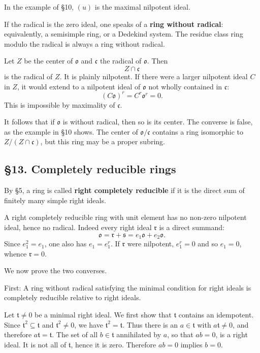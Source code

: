 \documentclass[11pt]{article}
\begin{document}
In the example of §10, \((u)\) is the maximal nilpotent ideal.

If the radical is the zero ideal, one speaks of a \textbf{ring without
radical}: equivalently, a semisimple ring, or a Dedekind system. The
residue class ring modulo the radical is always a ring without radical.

Let \(Z\) be the center of \(\mathfrak{o}\) and \(\mathfrak c\) the
radical of \(\mathfrak{o}\). Then \[
  Z\cap\mathfrak c
\] is the radical of \(Z\). It is plainly nilpotent. If there were a
larger nilpotent ideal \(C\) in \(Z\), it would extend to a nilpotent
ideal of \(\mathfrak{o}\) not wholly contained in \(\mathfrak c\): \[
  (C\mathfrak{o})^r=C^r\mathfrak{o}^r=0.
\] This is impossible by maximality of \(\mathfrak c\).

It follows that if \(\mathfrak{o}\) is without radical, then so is its
center. The converse is false, as the example in §10 shows. The center
of \(\mathfrak{o}/\mathfrak c\) contains a ring isomorphic to
\(Z/(Z\cap\mathfrak c)\), but this ring may be a proper subring.

\subsection{§13. Completely reducible
rings}\label{completely-reducible-rings}

By §5, a ring is called \textbf{right completely reducible} if it is the
direct sum of finitely many simple right ideals.

A right completely reducible ring with unit element has no non-zero
nilpotent ideal, hence no radical. Indeed every right ideal
\(\mathfrak r\) is a direct summand: \[
  \mathfrak{o}=\mathfrak r+\mathfrak s=e_1\mathfrak{o}+e_2\mathfrak{o}.
\] Since \(e_1^2=e_1\), one also has \(e_1=e_1^r\). If \(\mathfrak r\)
were nilpotent, \(e_1^r=0\) and so \(e_1=0\), whence \(\mathfrak r=0\).

We now prove the two converses.

First: A ring without radical satisfying the minimal condition for right
ideals is completely reducible relative to right ideals.

Let \(\mathfrak t\ne0\) be a minimal right ideal. We first show that
\(\mathfrak t\) contains an idempotent. Since
\(\mathfrak t^2\subseteq\mathfrak t\) and \(\mathfrak t^2\ne0\), we have
\(\mathfrak t^2=\mathfrak t\). Thus there is an \(a\in\mathfrak t\) with
\(a\mathfrak t\ne0\), and therefore \(a\mathfrak t=\mathfrak t\). The
set of all \(b\in\mathfrak t\) annihilated by \(a\), so that \(ab=0\),
is a right ideal. It is not all of \(\mathfrak t\), hence it is zero.
Therefore \(ab=0\) implies \(b=0\).
\end{document}
